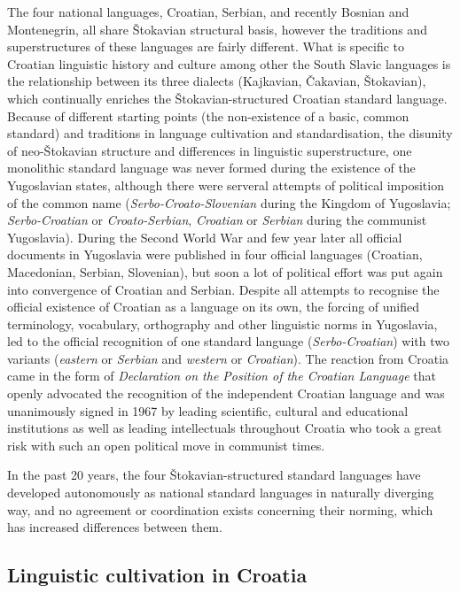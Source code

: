 \begin{multicols}{2}
The four national languages, Croatian, Serbian, and recently Bosnian and Montenegrin, all share Štokavian structural basis, however the traditions and superstructures of these languages are fairly different. What is specific to Croatian linguistic history and culture among other the South Slavic languages is the relationship between its three dialects (Kajkavian, Čakavian, Štokavian), which continually enriches the Štokavian-structured Croatian standard language. Because of different starting points (the non-existence of a basic, common standard) and traditions in language cultivation and standardisation, the disunity of neo-Štokavian structure and differences in linguistic superstructure, one monolithic standard language was never formed during the existence of the Yugoslavian states, although there were serveral attempts of political imposition of the common name (\emph{Serbo-Croato-Slovenian} during the Kingdom of Yugoslavia; \emph{Serbo-Croatian} or \emph{Croato-Serbian}, \emph{Croatian} or \emph{Serbian} during the communist Yugoslavia). During the Second World War and few year later all official documents in Yugoslavia were published in four official languages (Croatian, Macedonian, Serbian, Slovenian), but soon a lot of political effort was put again into convergence of Croatian and Serbian. Despite all attempts to recognise the official existence of Croatian as a language on its own, the forcing of unified terminology, vocabulary, orthography and other linguistic norms in Yugoslavia, led to the official recognition of one standard language (\emph{Serbo-Croatian}) with two variants (\emph{eastern} or \emph{Serbian} and \emph{western} or \emph{Croatian}). The reaction from Croatia came in the form of \emph{Declaration on the Position of the Croatian Language} that openly advocated the recognition of the independent Croatian language and was unanimously signed in 1967 by leading scientific, cultural and educational institutions as well as leading intellectuals throughout Croatia who took a great risk with such an open political move in communist times.

In the past 20 years, the four Štokavian-structured standard languages have developed autonomously as national standard languages in naturally diverging way, and no agreement or coordination exists concerning their norming, which has increased differences between them.

\subsection{Linguistic cultivation in Croatia}


\end{multicols}
